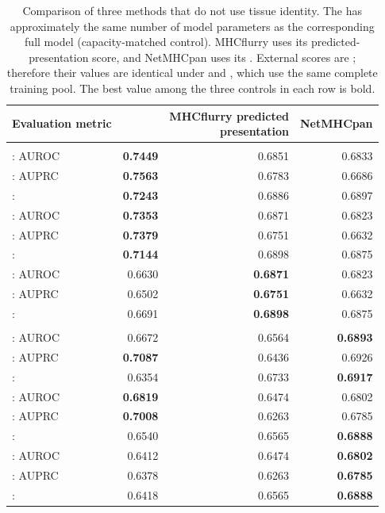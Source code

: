 \begin{table}[tbp]
\centering
\caption{Comparison of three methods that do not use tissue identity. The \plainMHCOnly{} has approximately the same number of model parameters as the corresponding full model (capacity-matched control). MHCflurry uses its predicted-presentation score, and NetMHCpan uses its \plainEL{}. External scores are \plainFrozen{}; therefore their values are identical under \plainMatchedOOF{} and \plainPeptideOOF{}, which use the same complete training pool. The best value among the three controls in each row is bold.}
\label{tab:rq6-tissue-blind-controls}
\scriptsize
\setlength{\tabcolsep}{4pt}
\begin{tabularx}{\textwidth}{@{}>{\raggedright\arraybackslash}Xrrr@{}}
\toprule
Evaluation metric & \plainMHCOnly{} & \shortstack{MHCflurry predicted\\presentation} & \shortstack{NetMHCpan\\\plainEL{}} \\
\midrule
\multicolumn{4}{@{}l}{\textit{Human}} \\
\plainFixedTest{}: AUROC & \textbf{0.7449} & 0.6851 & 0.6833 \\
\plainFixedTest{}: AUPRC & \textbf{0.7563} & 0.6783 & 0.6686 \\
\plainFixedTest{}: \plainPairAcc{} & \textbf{0.7243} & 0.6886 & 0.6897 \\
\addlinespace
\plainMatchedOOF{}: AUROC & \textbf{0.7353} & 0.6871 & 0.6823 \\
\plainMatchedOOF{}: AUPRC & \textbf{0.7379} & 0.6751 & 0.6632 \\
\plainMatchedOOF{}: \plainPairAcc{} & \textbf{0.7144} & 0.6898 & 0.6875 \\
\addlinespace
\plainPeptideOOF{}: AUROC & 0.6630 & \textbf{0.6871} & 0.6823 \\
\plainPeptideOOF{}: AUPRC & 0.6502 & \textbf{0.6751} & 0.6632 \\
\plainPeptideOOF{}: \plainPairAcc{} & 0.6691 & \textbf{0.6898} & 0.6875 \\
\midrule
\multicolumn{4}{@{}l}{\textit{Mouse}} \\
\plainFixedTest{}: AUROC & 0.6672 & 0.6564 & \textbf{0.6893} \\
\plainFixedTest{}: AUPRC & \textbf{0.7087} & 0.6436 & 0.6926 \\
\plainFixedTest{}: \plainPairAcc{} & 0.6354 & 0.6733 & \textbf{0.6917} \\
\addlinespace
\plainMatchedOOF{}: AUROC & \textbf{0.6819} & 0.6474 & 0.6802 \\
\plainMatchedOOF{}: AUPRC & \textbf{0.7008} & 0.6263 & 0.6785 \\
\plainMatchedOOF{}: \plainPairAcc{} & 0.6540 & 0.6565 & \textbf{0.6888} \\
\addlinespace
\plainPeptideOOF{}: AUROC & 0.6412 & 0.6474 & \textbf{0.6802} \\
\plainPeptideOOF{}: AUPRC & 0.6378 & 0.6263 & \textbf{0.6785} \\
\plainPeptideOOF{}: \plainPairAcc{} & 0.6418 & 0.6565 & \textbf{0.6888} \\
\bottomrule
\end{tabularx}
\end{table}

